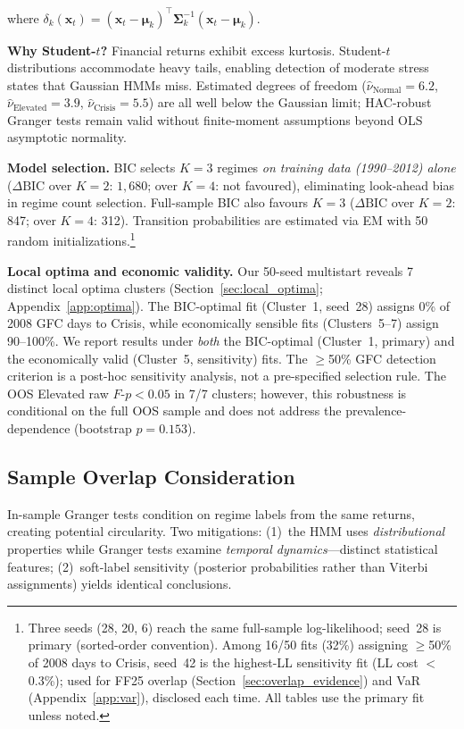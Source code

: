 \documentclass[sigconf,anonymous]{acmart}
\begin{document}
where $\delta_k(\mathbf{x}_t) = (\mathbf{x}_t - \boldsymbol{\mu}_k)^\top\boldsymbol{\Sigma}_k^{-1}(\mathbf{x}_t - \boldsymbol{\mu}_k)$.

\textbf{Why Student-$t$?} Financial returns exhibit excess kurtosis.
Student-$t$ distributions accommodate heavy tails, enabling detection of
moderate stress states that Gaussian HMMs miss.
Estimated degrees of freedom ($\hat{\nu}_{\text{Normal}} = 6.2$,
$\hat{\nu}_{\text{Elevated}} = 3.9$, $\hat{\nu}_{\text{Crisis}} = 5.5$)
are all well below the Gaussian limit; HAC-robust Granger tests remain
valid without finite-moment assumptions beyond OLS asymptotic normality.

\textbf{Model selection.} BIC selects $K=3$ regimes
\emph{on training data (1990--2012) alone}
($\Delta\text{BIC}$ over $K{=}2$: $1{,}680$; over $K{=}4$: not favoured),
eliminating look-ahead bias in regime count selection.
Full-sample BIC also favours $K{=}3$ ($\Delta\text{BIC}$ over $K{=}2$: 847;
over $K{=}4$: 312). Transition
probabilities are estimated via EM with 50 random
initializations.\footnote{Three seeds (28, 20, 6) reach the same full-sample
log-likelihood; seed~28 is primary (sorted-order convention).
Among 16/50 fits (32\%) assigning $\geq$50\% of 2008 days to Crisis,
seed~42 is the highest-LL sensitivity fit (LL cost $<$0.3\%); used for
FF25 overlap (Section~\ref{sec:overlap_evidence}) and VaR
(Appendix~\ref{app:var}), disclosed each time. All tables use the primary
fit unless noted.}

\textbf{Local optima and economic validity.}
Our 50-seed multistart reveals 7 distinct local optima clusters (Section~\ref{sec:local_optima};
Appendix~\ref{app:optima}). The BIC-optimal fit (Cluster~1, seed~28) assigns 0\% of 2008
GFC days to Crisis, while economically sensible fits (Clusters~5--7) assign
90--100\%. We report results under \emph{both} the BIC-optimal (Cluster~1, primary)
and the economically valid (Cluster~5, sensitivity) fits. The $\geq$50\% GFC detection
criterion is a post-hoc sensitivity analysis, not a pre-specified selection rule.
The OOS Elevated raw $F$-$p < 0.05$ in 7/7 clusters; however, this robustness
is conditional on the full OOS sample and does not address the prevalence-dependence
(bootstrap $p = 0.153$).

\subsection{Sample Overlap Consideration}

In-sample Granger tests condition on regime labels from the same returns,
creating potential circularity. Two mitigations: (1)~the HMM uses
\emph{distributional} properties while Granger tests examine \emph{temporal
dynamics}---distinct statistical features; (2)~soft-label sensitivity (posterior
probabilities rather than Viterbi assignments) yields identical conclusions.
\end{document}
